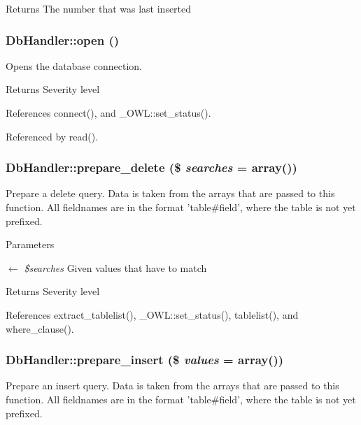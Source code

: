 \begin{DoxyReturn}{Returns}
The number that was last inserted 
\end{DoxyReturn}
\subsubsection[{open}]{\setlength{\rightskip}{0pt plus 5cm}DbHandler::open ()}\label{classDbHandler_afccbfc69ead84f8445116e050d1cfc2d}
Opens the database connection.

\begin{DoxyReturn}{Returns}
Severity level 
\end{DoxyReturn}


References connect(), and \_\-OWL::set\_\-status().



Referenced by read().

\subsubsection[{prepare\_\-delete}]{\setlength{\rightskip}{0pt plus 5cm}DbHandler::prepare\_\-delete (\$ {\em searches} = {\ttfamily array()})}\label{classDbHandler_a973e07b361c889b6ff44e93cc7665ca4}
Prepare a delete query. Data is taken from the arrays that are passed to this function. All fieldnames are in the format 'table\#field', where the table is not yet prefixed.


\begin{DoxyParams}{Parameters}
\item[\mbox{$\leftarrow$} {\em \$searches}]Given values that have to match \end{DoxyParams}
\begin{DoxyReturn}{Returns}
Severity level 
\end{DoxyReturn}


References extract\_\-tablelist(), \_\-OWL::set\_\-status(), tablelist(), and where\_\-clause().

\subsubsection[{prepare\_\-insert}]{\setlength{\rightskip}{0pt plus 5cm}DbHandler::prepare\_\-insert (\$ {\em values} = {\ttfamily array()})}\label{classDbHandler_a79e3237271c150c4f4f6c2593060567e}
Prepare an insert query. Data is taken from the arrays that are passed to this function. All fieldnames are in the format 'table\#field', where the table is not yet prefixed.


